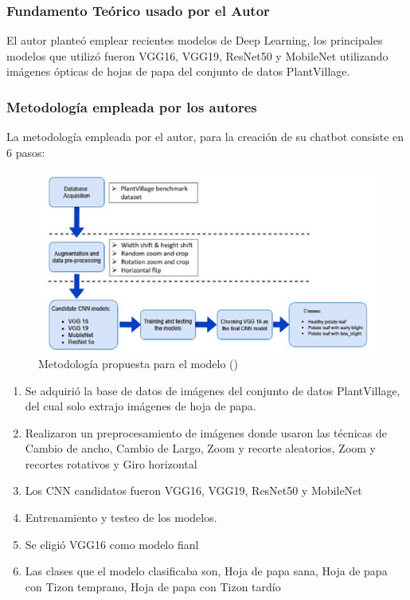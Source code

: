 \subsubsection{Fundamento Teórico usado por el Autor}
El autor planteó emplear recientes modelos de Deep Learning, los principales modelos que utilizó fueron VGG16, VGG19, ResNet50 y MobileNet utilizando imágenes ópticas de hojas de papa del conjunto de datos PlantVillage.



\subsubsection{Metodología empleada por los autores}
La metodología empleada por el autor, para la creación de su chatbot consiste en 6 pasos: 

\begin{figure}[h]
	\begin{center}
		\includegraphics[width=1\textwidth]{2/figures/ant1.jpeg}
		\caption{Metodología propuesta para el modelo (\cite{CHAKRABORTY2022101781})}
	\end{center}
\end{figure}

\begin{enumerate}
	\item Se adquirió la base de datos de imágenes del conjunto de datos PlantVillage, del cual solo extrajo imágenes de hoja de papa.
	\item Realizaron un preprocesamiento de imágenes donde usaron las técnicas de Cambio de ancho, Cambio de Largo, Zoom y recorte aleatorios, Zoom y recortes rotativos y Giro horizontal
	\item Los CNN candidatos fueron  VGG16, VGG19, ResNet50 y MobileNet
	\item Entrenamiento y testeo de los modelos.
	\item Se eligió VGG16 como modelo fianl
	\item Las clases que el modelo clasificaba son, Hoja de papa sana, Hoja de papa con Tizon temprano, Hoja de papa con Tizon tardío
\end{enumerate}

